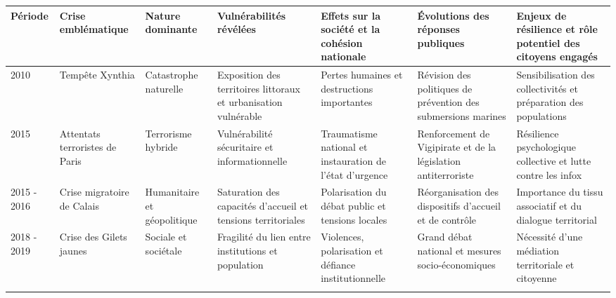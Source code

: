 \begin{table}[H]
\centering
\StyledTableSetup
\scriptsize

\xdef\noteCrisesApresDeuxMilleXynthia{\number\value{footnote}}
\xdef\noteCrisesApresDeuxMilleTerrorisme{\number\value{footnote}}
\xdef\noteCrisesApresDeuxMilleMigration{\number\value{footnote}}
\xdef\noteCrisesApresDeuxMilleGiletsJaunes{\number\value{footnote}}
\xdef\noteCrisesApresDeuxMilleCovid{\number\value{footnote}}
\xdef\noteCrisesApresDeuxMilleUkraine{\number\value{footnote}}

\begin{tabularx}{\linewidth}{@{}
p{1.2cm}
p{2.2cm}
p{2.1cm}
Y
Y
Y
Y
@{}}

\toprule
\textbf{Période} &
\textbf{Crise emblématique} &
\textbf{Nature dominante} &
\textbf{Vulnérabilités révélées} &
\textbf{Effets sur la société et la cohésion nationale} &
\textbf{Évolutions des réponses publiques} &
\textbf{Enjeux de résilience et rôle potentiel des citoyens engagés} \\
\midrule

2010 &
Tempête Xynthia &
Catastrophe naturelle &
Exposition des territoires littoraux et urbanisation vulnérable &
Pertes humaines et destructions importantes &
Révision des politiques de prévention des submersions marines &
Sensibilisation des collectivités et préparation des populations\footnotemark[\noteCrisesApresDeuxMilleXynthia] \\
\addlinespace

2015 &
Attentats terroristes de Paris &
Terrorisme hybride &
Vulnérabilité sécuritaire et informationnelle &
Traumatisme national et instauration de l'état d'urgence &
Renforcement de Vigipirate et de la législation antiterroriste &
Résilience psychologique collective et lutte contre les infox\footnotemark[\noteCrisesApresDeuxMilleTerrorisme] \\
\addlinespace

2015 - 2016 &
Crise migratoire de Calais &
Humanitaire et géopolitique &
Saturation des capacités d'accueil et tensions territoriales &
Polarisation du débat public et tensions locales &
Réorganisation des dispositifs d'accueil et de contrôle &
Importance du tissu associatif et du dialogue territorial\footnotemark[\noteCrisesApresDeuxMilleMigration] \\
\addlinespace

2018 - 2019 &
Crise des Gilets jaunes &
Sociale et sociétale &
Fragilité du lien entre institutions et population &
Violences, polarisation et défiance institutionnelle &
Grand débat national et mesures socio-économiques &
Nécessité d'une médiation territoriale et citoyenne\footnotemark[\noteCrisesApresDeuxMilleGiletsJaunes] \\
\addlinespace


\end{tabularx}
\end{table}
